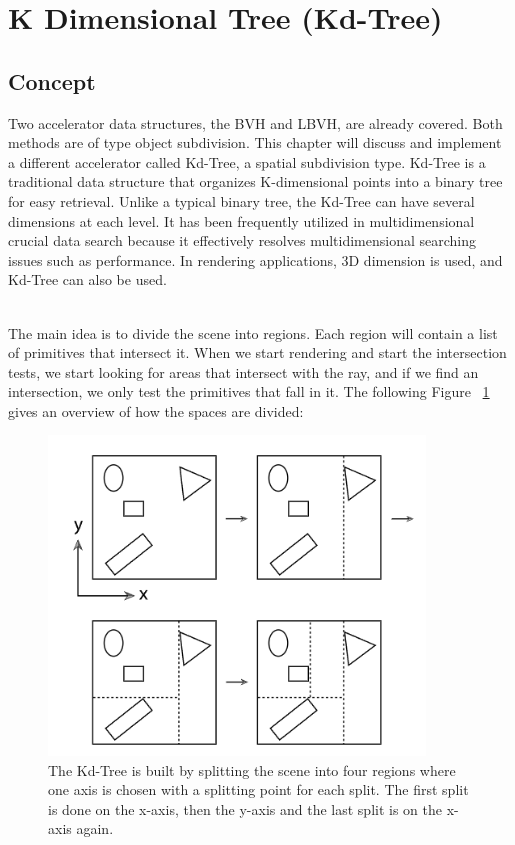 \documentclass[11pt,a4paper]{article}
\begin{document}
\section{K Dimensional Tree (Kd-Tree)}
\subsection{Concept}
Two accelerator data structures, the BVH and LBVH, are already covered. Both methods are of type object subdivision. This chapter will discuss and implement a different accelerator called Kd-Tree, a spatial subdivision type. Kd-Tree is a traditional data structure that organizes K-dimensional points into a binary tree for easy retrieval. Unlike a typical binary tree, the Kd-Tree can have several dimensions at each level. It has been frequently utilized in multidimensional crucial data search because it effectively resolves multidimensional searching issues such as performance. In rendering applications, 3D dimension is used, and Kd-Tree can also be used.

\noindent
\\
The main idea is to divide the scene into regions. Each region will contain a list of primitives that intersect it. When we start rendering and start the intersection tests, we start looking for areas that intersect with the ray, and if we find an intersection, we only test the primitives that fall in it. The following Figure ~\ref{fig:kdtreedemo} gives an overview of how the spaces are divided:


\begin{figure}[h]	
     \centering
     \captionsetup{justification=centering,margin=2cm}
     \includegraphics[width=10cm]{images/kdtree/example_demo.png}
     \caption{The Kd-Tree is built by splitting the scene into four regions where one axis is chosen with a splitting point for each split.  The first split is done on the x-axis, then the y-axis and the last split is on the x-axis again. \protect\cite{Pharr2016}}
        \label{fig:kdtreedemo}
\end{figure}
\end{document}
